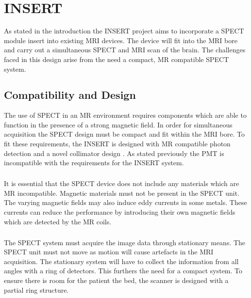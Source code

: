 \chapter{INSERT}
\label{chapterlabel2}

As stated in the introduction the INSERT project aims to incorporate a SPECT module insert into existing MRI devices. The device will fit into the MRI bore and carry out a simultaneous SPECT and MRI scan of the brain. The challenges faced in this design arise from the need a compact, MR compatible SPECT system.
\section{Compatibility and Design}
 The use of SPECT in an MR environment requires components which are able to function in the presence of a strong magnetic field. In order for simultaneous acquisition the SPECT design must be compact and fit within the MRI bore. To fit these requirements, the INSERT is designed with MR compatible photon detection \cite{7287793} and a novel collimator design \cite{7181734}. As stated previously the PMT is incompatible with the requirements for the INSERT system. 
\paragraph{}
It is essential that the SPECT device does not include any materials which are MR incompatible. Magnetic materials must not be present in the SPECT unit. The varying magnetic fields may also induce eddy currents in some metals. These currents can reduce the performance by introducing their own magnetic fields which are detected by the MR coils. 
\paragraph{}
The SPECT system must acquire the image data through stationary means. The SPECT unit must not move as motion will cause artefacts in the MRI acquisition. The stationary system will have to collect the information from all angles with a ring of detectors. This furthers the need for a compact system. To ensure there is room for the patient the bed, the scanner is designed with a partial ring structure.
